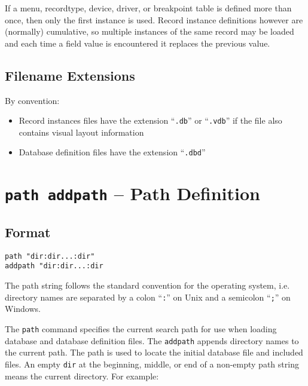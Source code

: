 If a menu, recordtype, device, driver, or breakpoint table is defined more than once, then only the first instance is used. 
Record instance definitions however are (normally) cumulative, so multiple instances of the same record may be loaded 
and each time a field value is encountered it replaces the previous value.

\subsection{Filename Extensions}

By convention:

\begin{itemize}
\item Record instances files have the extension ``\verb|.db|'' or ``\verb|.vdb|'' if the file also contains visual layout information

\item Database definition files have the extension ``\verb|.dbd|''

\end{itemize}

\section{\texttt{path addpath} -- Path Definition}

\subsection{Format}

\begin{verbatim}
path "dir:dir...:dir"
addpath "dir:dir...:dir
\end{verbatim}

The path string follows the standard convention for the operating system, i.e. directory names are separated by a colon ``\verb|:|'' on Unix
and a semicolon ``\verb|;|'' on Windows.

The \verb|path| command specifies the current search path for use when loading database and database definition files.
The \verb|addpath| appends directory names to the current path.
The path is used to locate the initial database file and included files.
An empty \verb|dir| at the beginning, middle, or end of a non-empty path string means the current directory.
For example:

